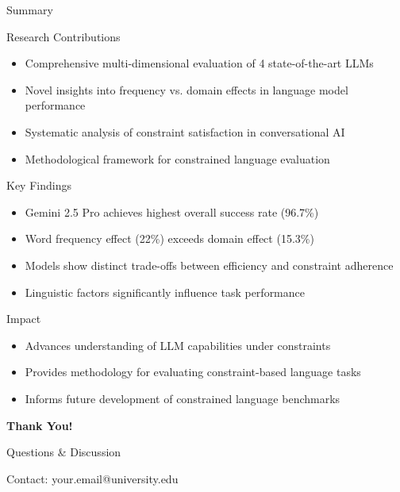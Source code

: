 \documentclass[aspectratio=169]{beamer}
\begin{document}
\begin{frame}{Summary}
\begin{block}{Research Contributions}
\begin{itemize}
    \item Comprehensive multi-dimensional evaluation of 4 state-of-the-art LLMs
    \item Novel insights into frequency vs. domain effects in language model performance
    \item Systematic analysis of constraint satisfaction in conversational AI
    \item Methodological framework for constrained language evaluation
\end{itemize}
\end{block}

\begin{block}{Key Findings}
\begin{itemize}
    \item Gemini 2.5 Pro achieves highest overall success rate (96.7\%)
    \item Word frequency effect (22\%) exceeds domain effect (15.3\%)
    \item Models show distinct trade-offs between efficiency and constraint adherence
    \item Linguistic factors significantly influence task performance
\end{itemize}
\end{block}

\begin{block}{Impact}
\begin{itemize}
    \item Advances understanding of LLM capabilities under constraints
    \item Provides methodology for evaluating constraint-based language tasks
    \item Informs future development of constrained language benchmarks
\end{itemize}
\end{block}
\end{frame}

\begin{frame}[plain]
\centering
\huge \textbf{Thank You!}
\vspace{1cm}

\Large Questions \& Discussion

\vspace{1cm}
\normalsize
Contact: your.email@university.edu
\end{frame}
\end{document}
